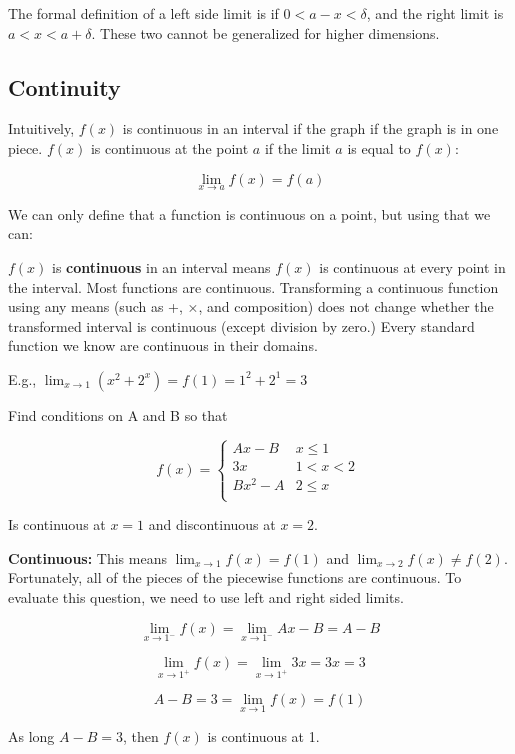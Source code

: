 \documentclass[
]{article}
\begin{document}
The formal definition of a left side limit is if $0 < a - x < \delta$,
and the right limit is $a < x < a + \delta$. These two cannot be
generalized for higher dimensions.


\subsection{Continuity}

Intuitively, $f(x)$ is continuous in an interval if the graph if the
graph is in one piece. $f(x)$ is continuous at the point $a$ if the
limit $a$ is equal to $f(x)$:

$$\lim_{x \rightarrow a}{f(x) = f(a)}$$

We can only define that a function is continuous on a point, but using
that we can:

$f(x)$ is \textbf{continuous} in an interval means $f(x)$ is
continuous at every point in the interval. Most functions are
continuous. Transforming a continuous function using any means (such as
+, ×, and composition) does not change whether the transformed interval
is continuous (except division by zero.) Every standard function we know
are continuous in their domains.

E.g.,
$\lim_{x \rightarrow 1}{\left( x^{2} + 2^{x} \right) = f(1) = 1^{2} + 2^{1} = 3}$

Find conditions on A and B so that

$$f(x) = \left\{ \begin{matrix}
Ax - B & x \leq 1 \\
3x & 1 < x < 2 \\
Bx^{2} - A & 2 \leq x \\
\end{matrix} \right.\ $$

Is continuous at $x = 1$ and discontinuous at $x = 2$.

\textbf{Continuous:} This means $\lim_{x \rightarrow 1}{f(x) = f(1)}$
and $\lim_{x \rightarrow 2}{f(x) \neq f(2)}$. Fortunately, all of the
pieces of the piecewise functions are continuous. To evaluate this
question, we need to use left and right sided limits.

$$\lim_{x \rightarrow 1^{-}}{f(x)} = \lim_{x \rightarrow 1^{-}}{Ax - B} = A - B$$

$$\lim_{x \rightarrow 1^{+}}{f(x)} = \lim_{x \rightarrow 1^{+}}{3x} = 3x = 3$$

$$A - B = 3 = \lim_{x \rightarrow 1}{f(x) = f(1)}$$

As long $A - B = 3$, then $f(x)$ is continuous at 1.
\end{document}
